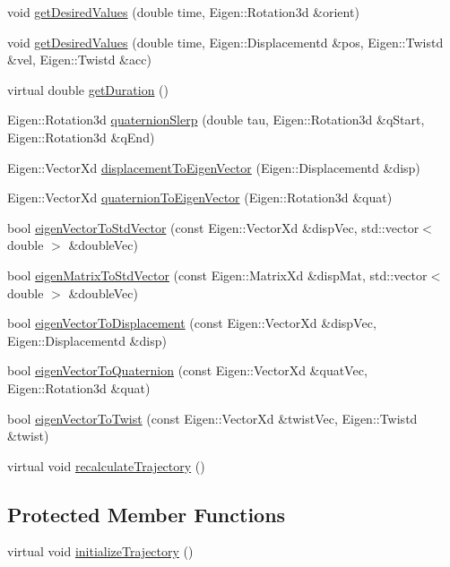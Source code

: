 \begin{DoxyCompactItemize}
\item 
void \hyperlink{classocra_1_1Trajectory_a05e7abae6b5dead3d5382bef15d0c803}{get\+Desired\+Values} (double time, Eigen\+::\+Rotation3d \&orient)
\item 
void \hyperlink{classocra_1_1Trajectory_af81c6d351f25f49ae02028d0ee9b34bd}{get\+Desired\+Values} (double time, Eigen\+::\+Displacementd \&pos, Eigen\+::\+Twistd \&vel, Eigen\+::\+Twistd \&acc)
\item 
virtual double \hyperlink{classocra_1_1Trajectory_ad65e4ce63f33d79d7880742035a64d6c}{get\+Duration} ()
\item 
Eigen\+::\+Rotation3d \hyperlink{classocra_1_1Trajectory_ad431ef279bae49c96ee628a1d529e0e1}{quaternion\+Slerp} (double tau, Eigen\+::\+Rotation3d \&q\+Start, Eigen\+::\+Rotation3d \&q\+End)
\item 
Eigen\+::\+Vector\+Xd \hyperlink{classocra_1_1Trajectory_ae430040a9159317971ce66f4bd3a162a}{displacement\+To\+Eigen\+Vector} (Eigen\+::\+Displacementd \&disp)
\item 
Eigen\+::\+Vector\+Xd \hyperlink{classocra_1_1Trajectory_a8067d74e524a9cef9d5247adc966ed66}{quaternion\+To\+Eigen\+Vector} (Eigen\+::\+Rotation3d \&quat)
\item 
bool \hyperlink{classocra_1_1Trajectory_a64c08a544337e1a1a50f2bbdd73f2005}{eigen\+Vector\+To\+Std\+Vector} (const Eigen\+::\+Vector\+Xd \&disp\+Vec, std\+::vector$<$ double $>$ \&double\+Vec)
\item 
bool \hyperlink{classocra_1_1Trajectory_a2a659e10b5701c8cd50a53ab00e69023}{eigen\+Matrix\+To\+Std\+Vector} (const Eigen\+::\+Matrix\+Xd \&disp\+Mat, std\+::vector$<$ double $>$ \&double\+Vec)
\item 
bool \hyperlink{classocra_1_1Trajectory_ac8f9c3fdb888707304a817866f13c244}{eigen\+Vector\+To\+Displacement} (const Eigen\+::\+Vector\+Xd \&disp\+Vec, Eigen\+::\+Displacementd \&disp)
\item 
bool \hyperlink{classocra_1_1Trajectory_a943c143409f5f8c49ec4878e5d7b838b}{eigen\+Vector\+To\+Quaternion} (const Eigen\+::\+Vector\+Xd \&quat\+Vec, Eigen\+::\+Rotation3d \&quat)
\item 
bool \hyperlink{classocra_1_1Trajectory_a74c6fb6857f2f7fe24dcb666acff8571}{eigen\+Vector\+To\+Twist} (const Eigen\+::\+Vector\+Xd \&twist\+Vec, Eigen\+::\+Twistd \&twist)
\item 
virtual void \hyperlink{classocra_1_1Trajectory_a9553f05fc24c76582e3d8d9db55df08b}{recalculate\+Trajectory} ()
\end{DoxyCompactItemize}
\subsection*{Protected Member Functions}
\begin{DoxyCompactItemize}
\item 
virtual void \hyperlink{classocra_1_1Trajectory_aa49b123abf79be71f131c138ff2a88b2}{initialize\+Trajectory} ()
\end{DoxyCompactItemize}
